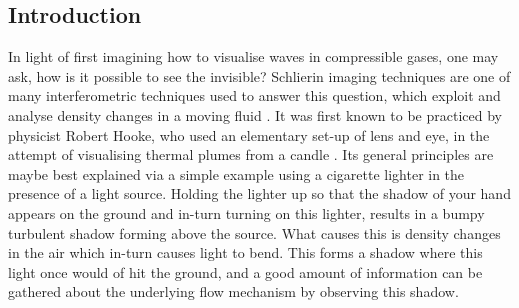 \documentclass[a4paper,10pt,twoside]{article}
\begin{document}
\begin{multicols}{2} 










\section{Introduction}





In light of first imagining how to visualise waves in compressible gases, one may ask, how is it possible to see the invisible? Schlierin imaging techniques are one of many interferometric techniques used to answer this question, which exploit and analyse density changes in a moving fluid \cite{1}. It was first known to be practiced by physicist Robert Hooke, who used an elementary set-up of lens and eye, in the attempt of visualising thermal plumes from a candle \cite{1}. Its general principles are maybe best explained via a simple example using a cigarette lighter in the presence of a light source. Holding the lighter up so that the shadow of your hand appears on the ground and in-turn turning on this lighter, results in a bumpy turbulent shadow forming above the source. What causes this is density changes in the air which in-turn causes light to bend. This forms a shadow where this light once would of hit the ground, and a good amount of information can be gathered about the underlying flow mechanism by observing this shadow. \par




\end{multicols}
\end{document}
